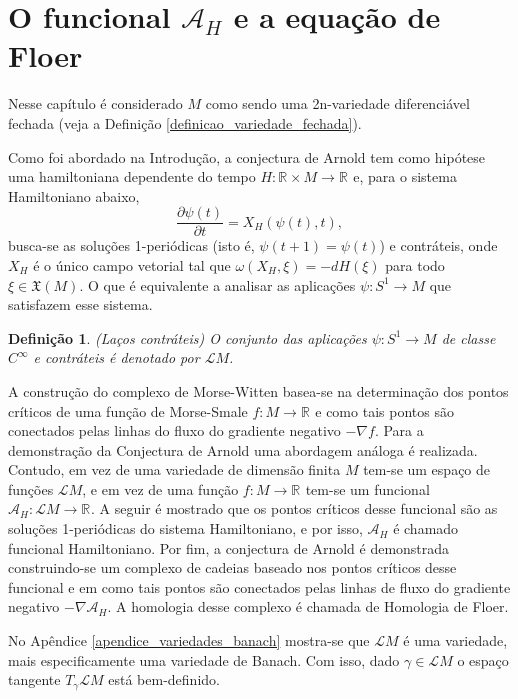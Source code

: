 \documentclass[12pt]{book}
\newtheorem{definicao}[teorema]{Definição}
\newcommand{\campohamiltonianoabrev}{X_{H}}
\newcommand{\campossuaves}[1]{\mathfrak{X}(#1)}
\newcommand{\circulo}{S^{1}}
\newcommand{\derivadaparcial}[2]{\frac{\partial #1}{\partial #2}}
\newcommand{\espacotangenteponto}[2]{T_{#1}#2}
\newcommand{\formaSimpletica}[2]{\omega(#1, #2)}
\newcommand{\funcionalH}{\mathcal{A}_{H}}
\newcommand{\gradiente}{\nabla f}
\newcommand{\gradientefuncional}{\nabla \funcionalH}
\newcommand{\retacartesianovariedade}{\real{} \times M}
\newcommand{\real}[1]{\mathbb{R}^{#1}}
\newcommand{\reta}{\real{}}
\newcommand{\lacocontrateis}{\mathcal{L}M}
\begin{document}
	\section{O funcional $\funcionalH$ e a equação de Floer}
	Nesse capítulo é considerado $M$ como sendo uma 2n-variedade diferenciável fechada (veja a Definição \ref{definicao_variedade_fechada}).
	
	Como foi abordado na Introdução, a conjectura de Arnold tem como hipótese uma hamiltoniana dependente do tempo $H: \retacartesianovariedade \to \reta$ e, para o sistema Hamiltoniano abaixo,
	$$
	\derivadaparcial{\psi(t)}{t} = X_{H}(\psi(t), t),
	$$
	busca-se as soluções 1-periódicas (isto é, $\psi(t+1)=\psi(t)$) e contráteis, onde $\campohamiltonianoabrev$ é o único campo vetorial tal que $\formaSimpletica{\campohamiltonianoabrev}{\xi} = -dH(\xi)$ para todo $\xi \in \campossuaves{M}$. O que é equivalente a analisar as aplicações $\psi : \circulo\to M$ que satisfazem esse sistema.
	
	\begin{definicao}
		(Laços contráteis) O conjunto das aplicações $\psi:\circulo \to M$ de classe $C^{\infty}$ e contráteis é denotado por $\lacocontrateis$.
	\end{definicao}
	
	A construção do complexo de Morse-Witten basea-se na determinação dos pontos críticos de uma função de Morse-Smale $f: M\to \reta$ e como tais pontos são conectados pelas linhas do fluxo do gradiente negativo $-\gradiente$. Para a demonstração da Conjectura de Arnold uma abordagem análoga é realizada. Contudo, em vez de uma variedade de dimensão finita $M$ tem-se um espaço de funções $\lacocontrateis$, e em vez de uma função $f:M\to \reta$ tem-se um funcional $\funcionalH:\lacocontrateis\to \reta$. A seguir é mostrado que os pontos críticos desse funcional são as soluções 1-periódicas do sistema Hamiltoniano, e por isso, $\funcionalH$ é chamado funcional Hamiltoniano. Por fim, a conjectura de Arnold é demonstrada construindo-se um complexo de cadeias baseado nos pontos críticos desse funcional e em como tais pontos são conectados pelas linhas de fluxo do gradiente negativo $-\gradientefuncional$. A homologia desse complexo é chamada de Homologia de Floer.
	
	No Apêndice \ref{apendice_variedades_banach} mostra-se que $\lacocontrateis$ é uma variedade, mais especificamente uma variedade de Banach. Com isso, dado $\gamma\in \lacocontrateis$ o espaço tangente $\espacotangenteponto{\gamma}{\lacocontrateis}$ está bem-definido.
	
\end{document}
